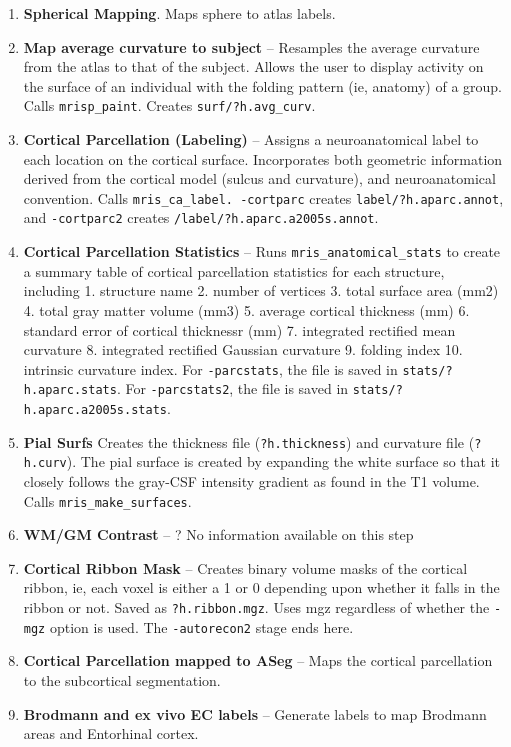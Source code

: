 \documentclass[paper=a4, fontsize=11pt]{scrartcl} %
\numberwithin{equation}{section} %
\numberwithin{figure}{section} %
\numberwithin{table}{section} %
\begin{document}
\begin{enumerate}
    \item \textbf{Spherical Mapping}. Maps sphere to atlas labels.
    
    \item \textbf{Map average curvature to subject} -- Resamples the average curvature from the atlas to that of the subject. Allows the user to display activity on the surface of an individual with the folding pattern (ie, anatomy) of a group. Calls \texttt{mrisp\_paint}. Creates \texttt{surf/?h.avg\_curv}.
    
    \item \textbf{Cortical Parcellation (Labeling)} -- Assigns a neuroanatomical label to each location on the cortical surface. Incorporates both geometric information derived from the cortical model (sulcus and curvature), and neuroanatomical convention. Calls \texttt{mris\_ca\_label. -cortparc} creates \texttt{label/?h.aparc.annot}, and \texttt{-cortparc2} creates \texttt{/label/?h.aparc.a2005s.annot}.
    
    \item \textbf{Cortical Parcellation Statistics} -- Runs \texttt{mris\_anatomical\_stats} to create a summary table of cortical parcellation statistics for each structure, including 1. structure name 2. number of vertices 3. total surface area (mm2) 4. total gray matter volume (mm3) 5. average cortical thickness (mm) 6. standard error of cortical thicknessr (mm) 7. integrated rectified mean curvature 8. integrated rectified Gaussian curvature 9. folding index 10. intrinsic curvature index. For \texttt{-parcstats}, the file is saved in \texttt{stats/?h.aparc.stats}. For \texttt{-parcstats2}, the file is saved in \texttt{stats/?h.aparc.a2005s.stats}.
	
	    \item \textbf{Pial Surfs} Creates the thickness file (\texttt{?h.thickness}) and curvature file (\texttt{?h.curv}). The pial surface is created by expanding the white surface so that it closely follows the gray-CSF intensity gradient as found in the T1 volume. Calls \texttt{mris\_make\_surfaces}.    
    
    \item \textbf{WM/GM Contrast} -- ? No information available on this step
    
    \item \textbf{Cortical Ribbon Mask} -- Creates binary volume masks of the cortical ribbon, ie, each voxel is either a 1 or 0 depending upon whether it falls in the ribbon or not. Saved as \texttt{?h.ribbon.mgz}. Uses mgz regardless of whether the \texttt{-mgz} option is used. The \texttt{-autorecon2} stage ends here.
    
    \item \textbf{Cortical Parcellation mapped to ASeg} -- Maps the cortical parcellation to the subcortical segmentation.
    
    \item  \textbf{Brodmann and ex vivo EC labels} -- Generate labels to map Brodmann areas and Entorhinal cortex.
    
\end{enumerate}
\end{document}
